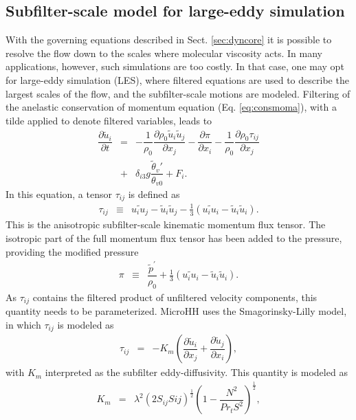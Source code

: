 \documentclass[gmd,manuscript]{copernicus}
\newcommand{\uf}{\ensuremath{\widetilde{u}}}
\newcommand{\thetaf}{\ensuremath{\widetilde{\theta}}}
\begin{document}
\subsection{Subfilter-scale model for large-eddy simulation}
With the governing equations described in Sect. \ref{sec:dyncore} it is possible to resolve the flow down to the scales where molecular viscosity acts. In many applications, however, such simulations are too costly. In that case, one may opt for large-eddy simulation (LES), where filtered equations are used to describe the largest scales of the flow, and the subfilter-scale motions are modeled. Filtering of the anelastic conservation of momentum equation (Eq. \ref{eq:consmoma}), with a tilde applied to denote filtered variables, leads to 
\begin{eqnarray}
\nonumber \dfrac{\partial \uf_i}{\partial t} & = & - \dfrac{1}{\rho_0} \dfrac{\partial \rho_0 \uf_i \uf_j}{\partial x_j} 
- \dfrac{\partial \pi}{\partial x_i} - \dfrac{1}{\rho_0} \dfrac{\partial \rho_0 \tau_{ij}}{\partial x_j}\\
& + & \delta_{i3} g \dfrac{\thetaf_v'}{\theta_{v0}} + F_i.\label{eq:consmoma_filter}
\end{eqnarray}
In this equation, a tensor $\tau_{ij}$ is defined as
\begin{eqnarray}
\tau_{ij}  & \equiv & \widetilde{u_i u_j} - \uf_i \uf_j - \frac{1}{3} \left( \widetilde{u_i u_i} - \uf_i \uf_i \right).
\end{eqnarray}
This is the anisotropic subfilter-scale kinematic momentum flux tensor. The isotropic part of the full momentum flux tensor has been added to the pressure, providing the modified pressure
\begin{eqnarray}
\pi & \equiv & \dfrac{\widetilde{p}^\prime}{\rho_0} + \frac{1}{3} \left( \widetilde{u_i u_i} - \uf_i \uf_i \right).
\end{eqnarray}
As $\tau_{ij}$ contains the filtered product of unfiltered velocity components, this quantity needs to be parameterized. MicroHH uses the Smagorinsky-Lilly \citep{Lilly1968} model, in which $\tau_{ij}$ is modeled as
\begin{eqnarray}
\tau_{ij} & = & -K_m \left( \dfrac{\partial \uf_i}{\partial x_j} + \dfrac{\partial \uf_j}{\partial x_i} \right),
\end{eqnarray}
with $K_m$ interpreted as the subfilter eddy-diffusivity. This quantity is modeled as 
\begin{eqnarray}
K_m    & = & \lambda^2 \left( 2 S_{ij} S{ij} \right)^\frac{1}{2}
\left(1 - \dfrac{N^2}{Pr_t S^2} \right)^\frac{1}{2},
\end{eqnarray}
\end{document}
